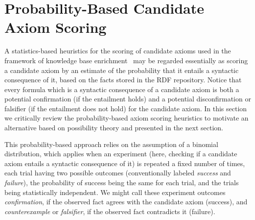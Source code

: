 \documentclass[conference]{IEEEtran}
\begin{document}
\section{Probability-Based Candidate Axiom Scoring}
\label{probability}

A statistics-based heuristics for the scoring of candidate axioms used
in the framework of knowledge base enrichment~\cite{BuehmannLehmann2012}
may be regarded essentially as scoring a candidate axiom by an estimate of the probability
that it entails a syntactic consequence of it, based on the facts stored in the RDF repository.
Notice that every formula which is a syntactic consequence of a candidate axiom is both
a potential confirmation (if the entailment holds) 
and a potential disconfirmation or falsifier (if the entailment does not hold) for the candidate axiom.
In this section we critically review the probability-based axiom scoring heuristics to motivate an alternative based on possibility theory and presented in the next section.


This probability-based approach relies on the assumption of a binomial distribution, which applies when an
experiment (here, checking if a candidate axiom entails a syntactic consequence of it) is repeated a fixed number of times, each trial having two possible outcomes
(conventionally labeled \emph{success} and \emph{failure}),
the probability of success being the same for each trial,
and the trials being statistically independent. We might call these experiment outcomes
\emph{confirmation}, if the observed fact agrees with the candidate axiom (success),
and \emph{counterexample} or \emph{falsifier}, if the observed fact contradicts it (failure).



\end{document}
